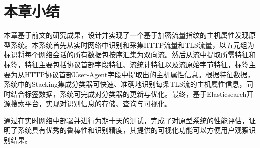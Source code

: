 \section{本章小结}

本章基于前文的研究成果，设计并实现了一个基于加密流量指纹的主机属性发现原型系统。本系统首先从实时网络中识别和采集HTTP流量和TLS流量，以五元组为标识将每个网络会话的所有数据包按序汇集为双向流。然后从流中提取所需特征和标签，特征主要包括协议首部字段特征、流统计特征以及流原始字节特征，标签主要为从HTTP协议首部User-Agent字段中提取出的主机属性信息。根据特征数据，系统中的Stacking集成分类器可快速、准确地识别每条TLS流的主机属性信息，同时结合标签数据，系统可完成对分类器的更新与优化。最终，基于Elasticsearch开源搜索平台，实现对识别信息的存储、查询与可视化。

通过在实时网络中部署并进行为期十天的测试，完成了对原型系统的性能评估，证明了系统具有优秀的鲁棒性和识别精度，其提供的可视化功能可以方便用户观察识别结果。
